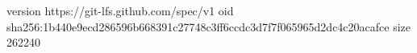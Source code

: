 version https://git-lfs.github.com/spec/v1
oid sha256:1b440e9ecd286596b668391c27748c3ff6ccdc3d7f7f065965d2dc4c20acafce
size 262240
